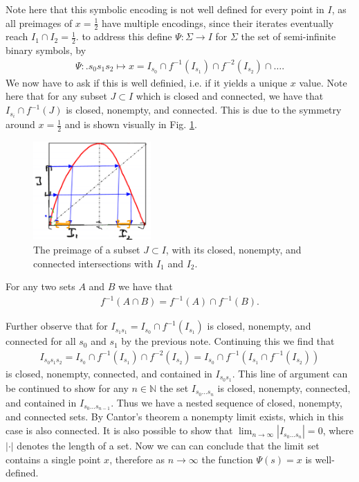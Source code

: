 \begin{ex}
Note here that this symbolic encoding is not well defined for every point in $I$, as all preimages of $x=\frac{1}{2}$ have multiple encodings, since their iterates eventually reach $I_{1}\cap I_{2} =\frac{1}{2}$. to address this define $\Psi:\Sigma \to I$ for $\Sigma$ the set of semi-infinite binary symbols, by
\begin{align}
	\Psi: \bm{.} s_0s_1s_2 \mapsto x = I_{s_0} \cap f^{-1}(I_{s_1}) \cap f^{-2}(I_{s_2}) \cap \ldots.
\end{align}
We now have to ask if this is well definied, i.e. if it yields a unique $x$ value. Note here that for any subset $J\subset I$ which is closed and connected, we have that $I_{s_i}\cap f^{-1}(J)$ is closed, nonempty, and connected. This is due to the symmetry around $x=\frac{1}{2}$ and is shown visually in Fig. \ref{fig:J_preimage}.
\begin{figure}[h!]
	\centering
	\includegraphics[width=0.4\textwidth]{figures/ch6/24J_preimage.png}
	\caption{The preimage of a subset $J\subset I$, with its closed, nonempty, and connected intersections with $I_1$ and $I_2$.}
	\label{fig:J_preimage}
\end{figure}

\begin{remark}[]
	For any two sets $A$ and $B$ we have that 
	\begin{align}
		f^{-1}(A \cap B) = f^{-1}(A) \cap f^{-1}(B).
	\end{align}
\end{remark}

Further observe that for $I_{s_1s_1}=I_{s_0}\cap f^{-1}(I_{s_1})$ is closed, nonempty, and connected for all $s_0$ and $s_1$ by the previous note. Continuing this we find that
\begin{align}
	I_{s_0s_1s_2} = I_{s_0} \cap f^{-1}(I_{s_1}) \cap f^{-2}(I_{s_2}) = I_{s_0} \cap f^{-1} \left( I_{s_1} \cap f^{-1}(I_{s_2})\right) 
\end{align}
is closed, nonempty, connected, and contained in $I _{s_0s_1}$. This line of argument can be continued to show for any $n \in \mathbb{N}$ the set $I_{s_0\ldots s_n}$ is closed, nonempty, connected, and contained in $I_{s_0 \ldots s_{n-1}}$. Thus we have a nested sequence of closed, nonempty, and connected sets. By Cantor's theorem a nonempty limit exists, which in this case is also connected. It is also possible to show that $\lim_{n\to \infty }|I_{s_0 \ldots s_n}| = 0$, where $|\cdot|$ denotes the length of a set. Now we can can conclude that the limit set contains a single point $x$, therefore as $n\to \infty $ the function $\Psi(s)=x$ is well-defined.


\end{ex}
